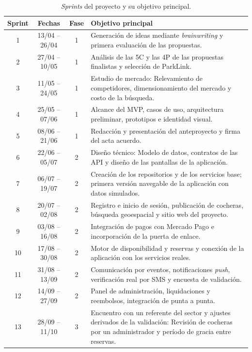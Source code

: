\begin{table}[H]
\centering
\renewcommand{\arraystretch}{1.3}
\small
\begin{tabularx}{\textwidth}{c c c >{\raggedright\arraybackslash}X}
\toprule
\textbf{Sprint} & \textbf{Fechas} & \textbf{Fase} & \textbf{Objetivo principal} \\
\midrule
1 & 13/04 -- 26/04 & 1 & Generación de ideas mediante \textit{brainwriting} y primera evaluación de las propuestas. \\
2 & 27/04 -- 10/05 & 1 & Análisis de las 5C y las 4P de las propuestas finalistas y selección de ParkLink. \\
3 & 11/05 -- 24/05 & 1 & Estudio de mercado: Relevamiento de competidores, dimensionamiento del mercado y costo de la búsqueda. \\
4 & 25/05 -- 07/06 & 1 & Alcance del MVP, casos de uso, arquitectura preliminar, prototipos e identidad visual. \\
5 & 08/06 -- 21/06 & 1 & Redacción y presentación del anteproyecto y firma del acta acuerdo. \\
\midrule
6 & 22/06 -- 05/07 & 2 & Diseño técnico: Modelo de datos, contratos de las API y diseño de las pantallas de la aplicación. \\
7 & 06/07 -- 19/07 & 2 & Creación de los repositorios y de los servicios base; primera versión navegable de la aplicación con datos simulados. \\
8 & 20/07 -- 02/08 & 2 & Registro e inicio de sesión, publicación de cocheras, búsqueda geoespacial y sitio web del proyecto. \\
9 & 03/08 -- 16/08 & 2 & Integración de pagos con Mercado Pago e incorporación de la puerta de enlace. \\
10 & 17/08 -- 30/08 & 2 & Motor de disponibilidad y reservas y conexión de la aplicación con los servicios reales. \\
11 & 31/08 -- 13/09 & 2 & Comunicación por eventos, notificaciones \textit{push}, verificación real por SMS y encuesta de validación. \\
12 & 14/09 -- 27/09 & 2 & Panel de administración, liquidaciones y reembolsos, integración de punta a punta. \\
\midrule
13 & 28/09 -- 11/10 & 3 & Encuentro con un referente del sector y ajustes derivados de la validación: Revisión de cocheras por un administrador y período de gracia entre reservas. \\
\bottomrule
\end{tabularx}
\caption{\textit{Sprints} del proyecto y su objetivo principal.}
\label{tab:sprints}
\end{table}

